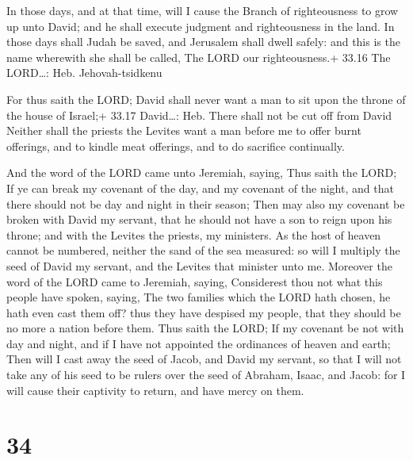  In those days, and at that time, will I cause the Branch
of righteousness to grow up unto David; and he shall execute judgment
and righteousness in the land.  In those days shall Judah
be saved, and Jerusalem shall dwell safely: and this is the name
wherewith she shall be called, The LORD our righteousness.+ 33.16 The
LORD\ldots: Heb. Jehovah-tsidkenu

 For thus saith the LORD; David shall never want a man to
sit upon the throne of the house of Israel;+ 33.17 David\ldots: Heb.
There shall not be cut off from David  Neither shall the
priests the Levites want a man before me to offer burnt offerings, and
to kindle meat offerings, and to do sacrifice continually.

 And the word of the LORD came unto Jeremiah, saying,
 Thus saith the LORD; If ye can break my covenant of the
day, and my covenant of the night, and that there should not be day and
night in their season;  Then may also my covenant be broken
with David my servant, that he should not have a son to reign upon his
throne; and with the Levites the priests, my ministers.  As
the host of heaven cannot be numbered, neither the sand of the sea
measured: so will I multiply the seed of David my servant, and the
Levites that minister unto me.  Moreover the word of the
LORD came to Jeremiah, saying,  Considerest thou not what
this people have spoken, saying, The two families which the LORD hath
chosen, he hath even cast them off? thus they have despised my people,
that they should be no more a nation before them.  Thus
saith the LORD; If my covenant be not with day and night, and if I have
not appointed the ordinances of heaven and earth;  Then
will I cast away the seed of Jacob, and David my servant, so that I will
not take any of his seed to be rulers over the seed of Abraham, Isaac,
and Jacob: for I will cause their captivity to return, and have mercy on
them.

\hypertarget{section-33}{%
\section{34}\label{section-33}}

